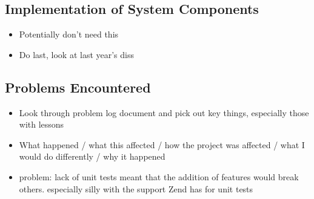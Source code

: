\subsection{Implementation of System Components}
{\color{red}
	\begin{itemize}
		\item Potentially don't need this
		\item Do last, look at last year's diss
	\end{itemize}
}


\subsection{Problems Encountered}
{\color{red}
	\begin{itemize}
		\item Look through problem log document and pick out key things, especially those with lessons
		\item What happened / what this affected / how the project was affected / what I would do differently / why it happened
		\item problem: lack of unit tests meant that the addition of features would break others. especially silly with the support Zend has for unit tests
	\end{itemize}
}
